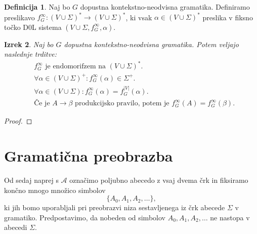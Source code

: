 \documentclass{amsart}
\newcommand{\A}{\mathcal{A}}
\theoremstyle{definition}
\newtheorem{definicija}{Definicija}[section]
\theoremstyle{plain} %
\newtheorem{izrek}[definicija]{Izrek}
\begin{document}
\begin{definicija}

    Naj bo $G$ dopustna kontekstno-neodvisna gramatika. Definiramo preslikavo
    $ f_G^\infty \colon (V \cup \Sigma)^* \to (V \cup \Sigma)^* $, ki vsak 
    $ \alpha \in (V \cup \Sigma)^* $ preslika v fiksno točko D0L sistema $ (V \cup \Sigma, f_G^\infty, \alpha) $.
    
\end{definicija}

\begin{izrek}

    Naj bo $G$ dopustna kontekstno-neodvisna gramatika. Potem veljajo naslednje trditve:
    \begin{align}
        & f_G^\infty \text{ je endomorifzem na } (V \cup \Sigma)^*. \\
        & \forall \alpha \in (V \cup \Sigma)^+ \colon f_G^\infty(\alpha) \in \Sigma^+. \\
        & \forall \alpha \in (V \cup \Sigma) \colon f_G^\infty(\alpha) = f_G^{|V|}(\alpha). \\
        &\text{Če je } A \rightarrow \beta \text{ produkcijsko pravilo, potem je } f_G^\infty(A) = f_G^\infty(\beta).
    \end{align}
    
\end{izrek}

\setcounter{equation}{0}

\begin{proof}
    
\end{proof}

\section{Gramatična preobrazba}

Od sedaj naprej s $\A$ označimo poljubno abecedo z vsaj dvema črk
in fiksiramo končno mnogo množico simbolov
\[
    \{A_0, A_1, A_2, \ldots \},
\]
ki jih bomo uporabljali pri preobrazvi niza sestavljenega
iz črk abecede $\Sigma$ v gramatiko. Predpostavimo, da nobeden
od simbolov $ A_0, A_1, A_2, \ldots $ ne nastopa v abecedi $\Sigma$.
\end{document}
